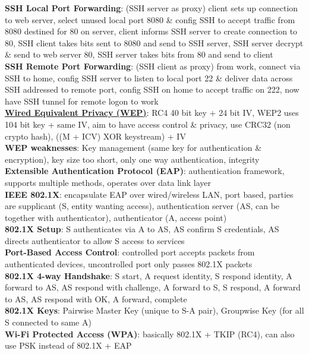 \documentclass[a4paper]{article}
\begin{document}
\begin{multicols}{2}
        \textbf{SSH Local Port Forwarding}: (SSH server as proxy) client sets up connection to web server, select unused local port 8080 \& config SSH to accept traffic from 8080 destined for 80 on server, client informs SSH server to create connection to 80, SSH client takes bits sent to 8080 and send to SSH server, SSH server decrypt \& send to web server 80, SSH server takes bits from 80 and send to client\\
        \textbf{SSH Remote Port Forwarding}: (SSH client as proxy) from work, connect via SSH to home, config SSH server to listen to local port 22 \& deliver data across SSH addressed to remote port, config SSH on home to accept traffic on 222, now have SSH tunnel for remote logon to work\\
        \underline{\textbf{Wired Equivalent Privacy (WEP)}}: RC4 40 bit key + 24 bit IV, WEP2 uses 104 bit key + same IV, aim to have access control \& privacy, use CRC32 (non crypto hash), ((M + ICV) XOR keystream) + IV\\
        \textbf{WEP weaknesses}: Key management (same key for authentication \& encryption), key size too short, only one way authentication, integrity\\
        \textbf{Extensible Authentication Protocol (EAP)}: authentication framework, supports multiple methods, operates over data link layer\\
        \textbf{IEEE 802.1X}: encapsulate EAP over wired/wireless LAN, port based, parties are supplicant (S, entity wanting access), authentication server (AS, can be together with authenticator), authenticator (A, access point)\\
        \textbf{802.1X Setup}: S authenticates via A to AS, AS confirm S credentials, AS directs authenticator to allow S access to services\\
        \textbf{Port-Based Access Control}: controlled port accepts packets from authenticated devices, uncontrolled port only passes 802.1X packets\\
        \textbf{802.1X 4-way Handshake}: S start, A request identity, S respond identity, A forward to AS, AS respond with challenge, A forward to S, S respond, A forward to AS, AS respond with OK, A forward, complete\\
        \textbf{802.1X Keys}: Pairwise Master Key (unique to S-A pair), Groupwise Key (for all S connected to same A)\\
        \textbf{Wi-Fi Protected Access (WPA)}: basically 802.1X + TKIP (RC4), can also use PSK instead of 802.1X + EAP\\

\end{multicols}
\end{document}
